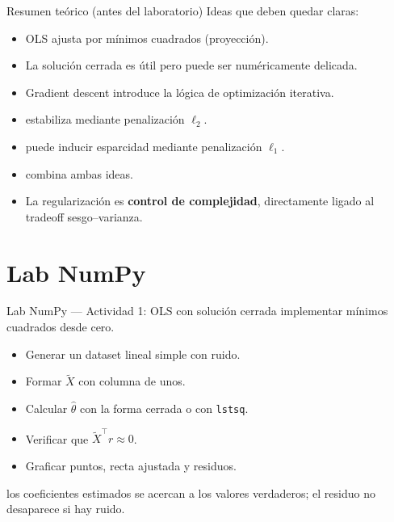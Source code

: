 \begin{frame}{Resumen teórico (antes del laboratorio)}
Ideas que deben quedar claras:
\begin{itemize}\small
  \item OLS ajusta por mínimos cuadrados (proyección).
  \item La solución cerrada es útil pero puede ser numéricamente delicada.
  \item Gradient descent introduce la lógica de optimización iterativa.
  \item {} estabiliza mediante penalización $\ell_2$.
  \item {} puede inducir esparcidad mediante penalización $\ell_1$.
  \item {} combina ambas ideas.
  \item La regularización es \textbf{control de complejidad}, directamente ligado al tradeoff sesgo--varianza.
\end{itemize}
\end{frame}

\section[Lab NumPy]{Lab NumPy\label{sec:lab-numpy-w09}}

\begin{frame}{Lab NumPy — Actividad 1: OLS con solución cerrada}
 implementar mínimos cuadrados desde cero.
\begin{itemize}\small
  \item Generar un dataset lineal simple con ruido.
  \item Formar $\tilde X$ con columna de unos.
  \item Calcular $\hat\theta$ con la forma cerrada o con \texttt{lstsq}.
  \item Verificar que $\tilde X^\top r\approx 0$.
  \item Graficar puntos, recta ajustada y residuos.
\end{itemize}

\vspace{0.2em}
los coeficientes estimados se acercan a los valores verdaderos; el residuo no desaparece si hay ruido.
\end{frame}

